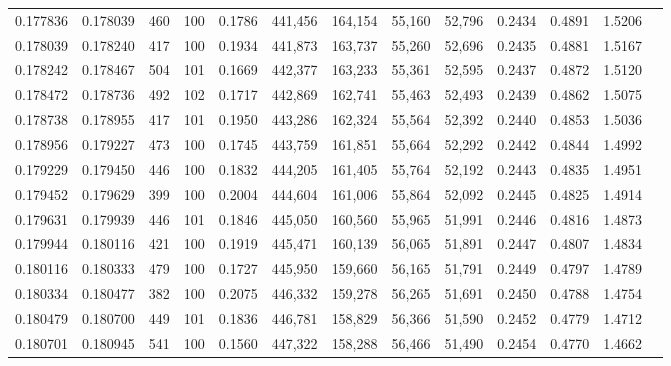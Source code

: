 \begin{tabular}{rrrrrrrrrrrrr}
0.177836 & 0.178039 &   460 & 100 &                                     0.1786 & 441,456 & 164,154 &  55,160 &  52,796 & 0.2434 & 0.4891 & 1.5206 \\
0.178039 & 0.178240 &   417 & 100 &                                     0.1934 & 441,873 & 163,737 &  55,260 &  52,696 & 0.2435 & 0.4881 & 1.5167 \\
0.178242 & 0.178467 &   504 & 101 &                                     0.1669 & 442,377 & 163,233 &  55,361 &  52,595 & 0.2437 & 0.4872 & 1.5120 \\
0.178472 & 0.178736 &   492 & 102 &                                     0.1717 & 442,869 & 162,741 &  55,463 &  52,493 & 0.2439 & 0.4862 & 1.5075 \\
0.178738 & 0.178955 &   417 & 101 &                                     0.1950 & 443,286 & 162,324 &  55,564 &  52,392 & 0.2440 & 0.4853 & 1.5036 \\
0.178956 & 0.179227 &   473 & 100 &                                     0.1745 & 443,759 & 161,851 &  55,664 &  52,292 & 0.2442 & 0.4844 & 1.4992 \\
0.179229 & 0.179450 &   446 & 100 &                                     0.1832 & 444,205 & 161,405 &  55,764 &  52,192 & 0.2443 & 0.4835 & 1.4951 \\
0.179452 & 0.179629 &   399 & 100 &                                     0.2004 & 444,604 & 161,006 &  55,864 &  52,092 & 0.2445 & 0.4825 & 1.4914 \\
0.179631 & 0.179939 &   446 & 101 &                                     0.1846 & 445,050 & 160,560 &  55,965 &  51,991 & 0.2446 & 0.4816 & 1.4873 \\
0.179944 & 0.180116 &   421 & 100 &                                     0.1919 & 445,471 & 160,139 &  56,065 &  51,891 & 0.2447 & 0.4807 & 1.4834 \\
0.180116 & 0.180333 &   479 & 100 &                                     0.1727 & 445,950 & 159,660 &  56,165 &  51,791 & 0.2449 & 0.4797 & 1.4789 \\
0.180334 & 0.180477 &   382 & 100 &                                     0.2075 & 446,332 & 159,278 &  56,265 &  51,691 & 0.2450 & 0.4788 & 1.4754 \\
0.180479 & 0.180700 &   449 & 101 &                                     0.1836 & 446,781 & 158,829 &  56,366 &  51,590 & 0.2452 & 0.4779 & 1.4712 \\
0.180701 & 0.180945 &   541 & 100 &                                     0.1560 & 447,322 & 158,288 &  56,466 &  51,490 & 0.2454 & 0.4770 & 1.4662 \\

\end{tabular}
